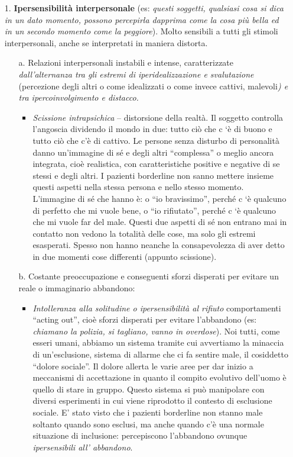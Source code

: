 \begin{itemize}
\item[1.]
  \textbf{Ipersensibilità interpersonale} (es: \emph{questi soggetti,
  qualsiasi cosa si dica in un dato momento, possono percepirla dapprima
  come la cosa più bella ed in un secondo momento come la peggiore}).
  Molto sensibili a tutti gli stimoli interpersonali, anche se
  interpretati in maniera distorta.

\begin{itemize}
\item[a.]
  Relazioni interpersonali instabili e intense, caratterizzate
  \emph{dall'alternanza tra gli estremi di iperidealizzazione e
  svalutazione} (percezione degli altri o come idealizzati o come invece
  cattivi, malevoli\emph{) e tra ipercoinvolgimento e distacco.}

\begin{itemize}
\item
  \emph{\emph{Scissione intrapsichica}} -- distorsione della realtà. Il
  soggetto controlla l'angoscia dividendo il mondo in due: tutto ciò che
  c `è di buono e tutto ciò che c'è di cattivo. Le persone senza
  disturbo di personalità danno un'immagine di sé e degli altri
  ``complessa'' o meglio ancora integrata, cioè realistica, con
  caratteristiche positive e negative di se stessi e degli altri. I
  pazienti borderline non sanno mettere insieme questi aspetti nella
  stessa persona e nello stesso momento. L'immagine di sé che hanno è: o
  ``io bravissimo'', perché c `è qualcuno di perfetto che mi vuole bene,
  o ``io rifiutato'', perché c `è qualcuno che mi vuole far del male.
  Questi due aspetti di sé non entrano mai in contatto non vedono la
  totalità delle cose, ma solo gli estremi esasperati. Spesso non hanno
  neanche la consapevolezza di aver detto in due momenti cose differenti
  (appunto scissione).
\end{itemize}

\item[b.]
  Costante preoccupazione e conseguenti sforzi disperati per evitare un
  reale o immaginario abbandono:

\begin{itemize}
\item
  \emph{\emph{Intolleranza alla solitudine o ipersensibilità al
  rifiuto}} comportamenti ``acting out'', cioè sforzi disperati per
  evitare l'abbandono (es: \emph{chiamano la polizia, si tagliano, vanno
  in overdose}). Noi tutti, come esseri umani, abbiamo un sistema
  tramite cui avvertiamo la minaccia di un'esclusione, sistema di
  allarme che ci fa sentire male, il cosiddetto ``dolore sociale''. Il
  dolore allerta le varie aree per dar inizio a meccanismi di
  accettazione in quanto il compito evolutivo dell'uomo è quello di
  stare in gruppo. Questo sistema si può manipolare con diversi
  esperimenti in cui viene riprodotto il contesto di esclusione sociale.
  E' stato visto che i pazienti borderline non stanno male soltanto
  quando sono esclusi, ma anche quando c'è una normale situazione di
  inclusione: percepiscono l'abbandono ovunque \emph{ipersensibili all'
  abbandono}.
\end{itemize}


\end{itemize}
\end{itemize}
